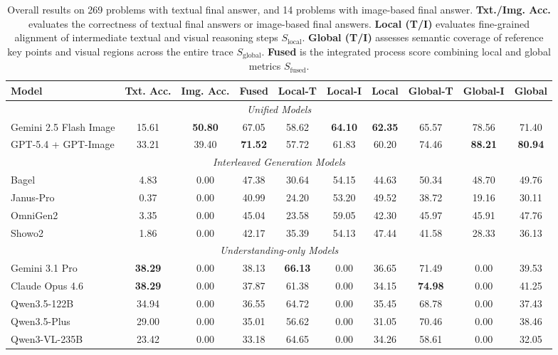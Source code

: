 \documentclass[11pt]{article}
\begin{document}
\begin{table}[t]
  \centering\tabcolsep 4pt
  \small
  \begin{tabular}{l|ccc|ccc|ccc}
    \toprule
    Model & Txt. Acc. & Img. Acc. & Fused & Local-T & Local-I & Local & Global-T & Global-I & Global \\
    \midrule
    \multicolumn{10}{c}{\textit{Unified Models}} \\
    \midrule
    Gemini 2.5 Flash Image & 15.61 & {\bf 50.80} & 67.05 & 58.62 & {\bf 64.10} & {\bf 62.35} & 65.57 & 78.56 & 71.40 \\
    GPT-5.4 + GPT-Image & 33.21 & 39.40 & {\bf 71.52} & 57.72 & 61.83 & 60.20 & 74.46 & {\bf 88.21} & {\bf 80.94} \\
    \midrule
    \multicolumn{10}{c}{\textit{Interleaved Generation Models}} \\
    \midrule
    Bagel & 4.83 & 0.00 & 47.38 & 30.64 & 54.15 & 44.63 & 50.34 & 48.70 & 49.76 \\
    Janus-Pro & 0.37 & 0.00 & 40.99 & 24.20 & 53.20 & 49.52 & 38.72 & 19.16 & 30.11 \\
    OmniGen2 & 3.35 & 0.00 & 45.04 & 23.58 & 59.05 & 42.30 & 45.97 & 45.91 & 47.76 \\
    Showo2 & 1.86 & 0.00 & 42.17 & 35.39 & 54.13 & 47.44 & 41.58 & 28.33 & 36.13 \\
    \midrule
    \multicolumn{10}{c}{\textit{Understanding-only Models}} \\
    \midrule
    Gemini 3.1 Pro & {\bf 38.29} & 0.00 & 38.13 & {\bf 66.13} & 0.00 & 36.65 & 71.49 & 0.00 & 39.53 \\
    Claude Opus 4.6 & {\bf 38.29} & 0.00 & 37.87 & 61.38 & 0.00 & 34.15 & {\bf 74.98} & 0.00 & 41.25 \\
    Qwen3.5-122B & 34.94 & 0.00 & 36.55 & 64.72 & 0.00 & 35.45 & 68.78 & 0.00 & 37.43 \\
    Qwen3.5-Plus & 29.00 & 0.00 & 35.01 & 56.62 & 0.00 & 31.05 & 70.46 & 0.00 & 38.46 \\
    Qwen3-VL-235B & 23.42 & 0.00 & 33.18 & 64.65 & 0.00 & 34.26 & 58.61 & 0.00 & 32.05\\
    \bottomrule
  \end{tabular}
  \caption{Overall results on 269 problems with textual final answer, and 14 problems with image-based final answer. \textbf{Txt./Img. Acc.} evaluates the correctness of textual final answers or image-based final answers. \textbf{Local (T/I) }evaluates fine-grained alignment of intermediate textual and visual reasoning steps $S_{\text{local}}$. \textbf{Global (T/I)} assesses semantic coverage of reference key points and visual regions across the entire trace $S_{\text{global}}$. \textbf{Fused }is the integrated process score combining local and global metrics $S_{\text{fused}}$.}
  \label{tab:main_results}
\end{table}
\end{document}

